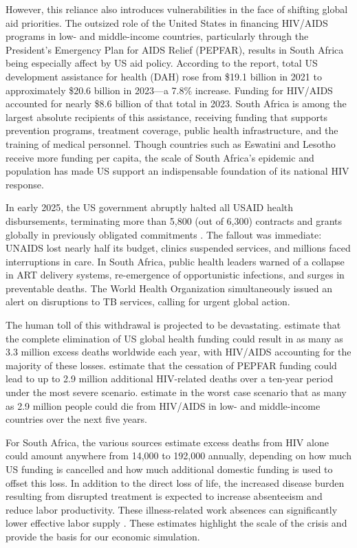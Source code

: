\documentclass[letterpaper,12pt]{article}
\theoremstyle{definition}
\begin{document}
\begin{spacing}{1.5}
However, this reliance also introduces vulnerabilities in the face of shifting global aid priorities.  The outsized role of the United States in financing HIV/AIDS programs in low- and middle-income countries, particularly through the President's Emergency Plan for AIDS Relief (PEPFAR), results in South Africa being especially affect by US aid policy. According to the \citet{FGH2023} report, total US development assistance for health (DAH) rose from \$19.1 billion in 2021 to approximately \$20.6 billion in 2023—a 7.8\% increase. Funding for HIV/AIDS accounted for nearly \$8.6 billion of that total in 2023. South Africa is among the largest absolute recipients of this assistance, receiving funding that supports prevention programs, treatment coverage, public health infrastructure, and the training of medical personnel. Though countries such as Eswatini and Lesotho receive more funding per capita, the scale of South Africa's epidemic and population has made US support an indispensable foundation of its national HIV response.

In early 2025, the US government abruptly halted all USAID health disbursements, terminating more than 5,800 (out of 6,300) contracts and grants globally in previously obligated commitments \citep{Cohen2025}. The fallout was immediate: UNAIDS lost nearly half its budget, clinics suspended services, and millions faced interruptions in care. In South Africa, public health leaders warned of a collapse in ART delivery systems, re-emergence of opportunistic infections, and surges in preventable deaths. The World Health Organization simultaneously issued an alert on disruptions to TB services, calling for urgent global action.

The human toll of this withdrawal is projected to be devastating. \citet{KS2025} estimate that the complete elimination of US global health funding could result in as many as 3.3 million excess deaths worldwide each year, with HIV/AIDS accounting for the majority of these losses. \citet{Gandhi2025} estimate that the cessation of PEPFAR funding could lead to up to 2.9 million additional HIV-related deaths over a ten-year period under the most severe scenario.  estimate in the worst case scenario that as many as 2.9 million people could die from HIV/AIDS in low- and middle-income countries over the next five years.

For South Africa, the various sources estimate excess deaths from HIV alone could amount anywhere from 14,000 to 192,000 annually, depending on how much US funding is cancelled and how much additional domestic funding is used to offset this loss. In addition to the direct loss of life, the increased disease burden resulting from disrupted treatment is expected to increase absenteeism and reduce labor productivity. These illness-related work absences can significantly lower effective labor supply \citep{Keogh2024,Panda2024}. These estimates highlight the scale of the crisis and provide the basis for our economic simulation.


\end{spacing}
\end{document}
